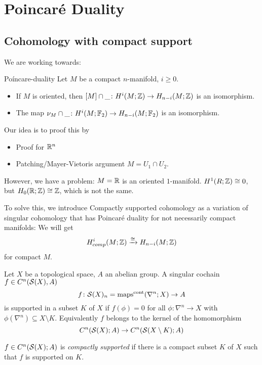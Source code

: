 \documentclass[language=english]{TemplateLecture}
\begin{document}
\chapter{Poincaré Duality}

\section{Cohomology with compact support}

We are working towards:

\begin{thm}{Poíncare-duality}{}
    Let \(M\) be a compact \(n\)-manifold, \(i \geq 0\).
    \begin{itemize}
        \item If \(M\) is oriented, then \([M] \cap \_ \colon H^{i}(M; \mathbb{Z}) \to H_{n-i}(M; \mathbb{Z})\) is an isomorphism.
        \item The map \(\nu_M \cap \_ \colon H^{i}(M; \mathbb{F}_2) \to H_{n-i}(M; \mathbb{F}_2)\) is an isomorphism.
    \end{itemize}
\end{thm}

Our idea is to proof this by
\begin{itemize}
    \item Proof for \(\mathbb{R}^n\)
    \item Patching/Mayer-Vietoris argument \(M = U_1 \cap U_2\).
\end{itemize}

However, we have a problem: \(M = \mathbb{R}\) is an oriented \(1\)-manifold. \(H^{1}(R; \mathbb{Z}) \cong 0\), but \(H_0(\mathbb{R}; \mathbb{Z}) \cong \mathbb{Z}\), which is not the same.

To solve this, we introduce Compactly supported cohomology as a variation of singular cohomology that has Poincaré duality for not necessarily compact manifolds: We will get
\[H_{comp}^{i}(M; \mathbb{Z}) \xrightarrow{\cong} H_{n-i}(M; \mathbb{Z})\]
for compact \(M\).

\begin{construction}
    Let \(X\) be a topological space, \(A\) an abelian group. A singular cochain \(f \in C^n(\mathcal{S}(X),A)\)
    \[f \colon \mathcal{S}(X)_n = \mathrm{maps}^{\text{cont}}(\nabla^n; X) \to A\]
    is supported in a subset \(K\) of \(X\) if \(f(\phi) = 0\) for all \(\phi\colon \nabla^n \to X\) with \(\phi(\nabla^n) \subseteq X \setminus K\). Equivalently \(f\) belongs to the kernel of the homomorphism
    \[C^n(\mathcal{S}(X);A) \to C^n (\mathcal{S}(X\setminus K); A)\]

    \(f \in C^n(\mathcal{S}(X);A) \) is \emph{compactly supported} if there is a compact subset \(K\) of \(X\) such that \(f\) is supported on \(K\).
\end{construction}
\end{document}
